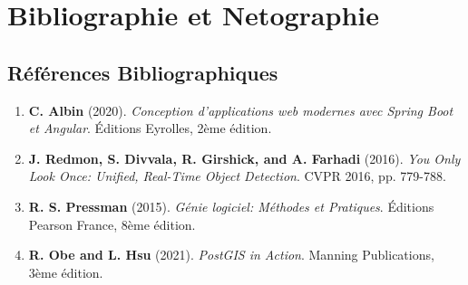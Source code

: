 
\thispagestyle{plain}
\chapter*{Bibliographie et Netographie}

\section*{Références Bibliographiques}
\begin{enumerate}
    \item \textbf{C. Albin} (2020). \textit{Conception d'applications web modernes avec Spring Boot et Angular}. Éditions Eyrolles, 2ème édition.
    \item \textbf{J. Redmon, S. Divvala, R. Girshick, and A. Farhadi} (2016). \textit{You Only Look Once: Unified, Real-Time Object Detection}. CVPR 2016, pp. 779-788.
    \item \textbf{R. S. Pressman} (2015). \textit{Génie logiciel: Méthodes et Pratiques}. Éditions Pearson France, 8ème édition.
    \item \textbf{R. Obe and L. Hsu} (2021). \textit{PostGIS in Action}. Manning Publications, 3ème édition.
\end{enumerate}

\vspace{0.5cm}

